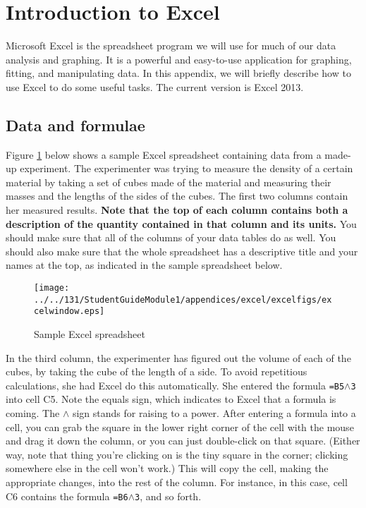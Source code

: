 
\section{Introduction to Excel}
\label{excel}

Microsoft Excel is the spreadsheet program we will use for much of our
data analysis and graphing.  It is a powerful and easy-to-use
application for graphing, fitting, and manipulating data. In this
appendix, we will briefly describe how to use Excel to do some useful
tasks.  The current version is Excel 2013.

\subsection{Data and formulae}

Figure \ref{fig:excel} below shows a sample Excel spreadsheet containing data
from a made-up experiment.  The experimenter was trying to measure
the density of a certain material by taking a set of cubes
made of the material and measuring their masses and the lengths of
the sides of the cubes.  The first two columns contain her measured
results.  \textbf{Note that the top of each column contains both
a description of the quantity contained in that column and its units.}
You should make sure that all of the columns of your data tables do as well.
You should also make sure that the whole spreadsheet has a descriptive
title and your names at the top, as indicated in the sample spreadsheet 
below.

\begin{figure}[b!]
\centerline{\texttt{[image: ../../131/StudentGuideModule1/appendices/excel/excelfigs/excelwindow.eps]}}
\caption{Sample Excel spreadsheet}
\label{fig:excel}
\end{figure}

In the third column, the experimenter has figured out the volume
of each of the cubes, by taking the cube of the length of a side.
To avoid repetitious calculations, she had Excel do this automatically.
She entered the formula {\tt =B5$\wedge$3}  into cell C5.
Note the equals sign, which indicates to Excel that a formula is coming.
The $\wedge$ sign stands for raising to a power.  After entering a formula
into a cell, you can grab the square in the lower right corner of the
cell with the mouse and drag it down the column, or you can just double-click
on that square.  (Either way, note that thing you're clicking on is
the tiny square in the corner; clicking somewhere else in the cell won't work.)
This will copy
the cell, making the appropriate changes, into the rest of the column.
For instance, in this case, cell C6 contains the formula {\tt =B6$\wedge$3},
and so forth.

